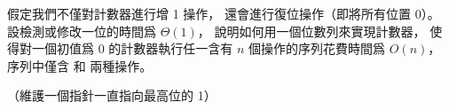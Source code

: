 \startEXERCISE
假定我們不僅對計數器進行增 1 操作，
還會進行復位操作（即將所有位置 0）。
設檢測或修改一位的時間爲 $\Theta(1)$，
說明如何用一個位數列來實現計數器，
使得對一個初值爲 0 的計數器執行任一含有 $n$ 個操作的序列花費時間爲 $O(n)$，
序列中僅含  和  兩種操作。

（\hint 維護一個指針一直指向最高位的 1）
\stopEXERCISE

\startANSWER
{}
\stopANSWER
